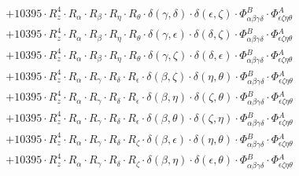 \documentclass{article}
\begin{document}
\begin{equation}
\begin{array}{c}
 \\[0.2em] 		 + 10395 \cdot R_{z}^{4} \cdot R_{\alpha{}} \cdot R_{\beta{}} \cdot R_{\eta{}} \cdot R_{\theta{}} \cdot \delta{}\left(\gamma{}, \delta{}\right) \cdot \delta{}\left(\epsilon{}, \zeta{}\right) \cdot \Phi{}^{B}_{\alpha{}\beta{}\gamma{}\delta{}} \cdot \Phi{}^{A}_{\epsilon{}\zeta{}\eta{}\theta{}} 
 \\[0.2em] 		 + 10395 \cdot R_{z}^{4} \cdot R_{\alpha{}} \cdot R_{\beta{}} \cdot R_{\eta{}} \cdot R_{\theta{}} \cdot \delta{}\left(\gamma{}, \epsilon{}\right) \cdot \delta{}\left(\delta{}, \zeta{}\right) \cdot \Phi{}^{B}_{\alpha{}\beta{}\gamma{}\delta{}} \cdot \Phi{}^{A}_{\epsilon{}\zeta{}\eta{}\theta{}} 
 \\[0.2em] 		 + 10395 \cdot R_{z}^{4} \cdot R_{\alpha{}} \cdot R_{\beta{}} \cdot R_{\eta{}} \cdot R_{\theta{}} \cdot \delta{}\left(\gamma{}, \zeta{}\right) \cdot \delta{}\left(\delta{}, \epsilon{}\right) \cdot \Phi{}^{B}_{\alpha{}\beta{}\gamma{}\delta{}} \cdot \Phi{}^{A}_{\epsilon{}\zeta{}\eta{}\theta{}} 
 \\[0.2em] 		 + 10395 \cdot R_{z}^{4} \cdot R_{\alpha{}} \cdot R_{\gamma{}} \cdot R_{\delta{}} \cdot R_{\epsilon{}} \cdot \delta{}\left(\beta{}, \zeta{}\right) \cdot \delta{}\left(\eta{}, \theta{}\right) \cdot \Phi{}^{B}_{\alpha{}\beta{}\gamma{}\delta{}} \cdot \Phi{}^{A}_{\epsilon{}\zeta{}\eta{}\theta{}} 
 \\[0.2em] 		 + 10395 \cdot R_{z}^{4} \cdot R_{\alpha{}} \cdot R_{\gamma{}} \cdot R_{\delta{}} \cdot R_{\epsilon{}} \cdot \delta{}\left(\beta{}, \eta{}\right) \cdot \delta{}\left(\zeta{}, \theta{}\right) \cdot \Phi{}^{B}_{\alpha{}\beta{}\gamma{}\delta{}} \cdot \Phi{}^{A}_{\epsilon{}\zeta{}\eta{}\theta{}} 
 \\[0.2em] 		 + 10395 \cdot R_{z}^{4} \cdot R_{\alpha{}} \cdot R_{\gamma{}} \cdot R_{\delta{}} \cdot R_{\epsilon{}} \cdot \delta{}\left(\beta{}, \theta{}\right) \cdot \delta{}\left(\zeta{}, \eta{}\right) \cdot \Phi{}^{B}_{\alpha{}\beta{}\gamma{}\delta{}} \cdot \Phi{}^{A}_{\epsilon{}\zeta{}\eta{}\theta{}} 
 \\[0.2em] 		 + 10395 \cdot R_{z}^{4} \cdot R_{\alpha{}} \cdot R_{\gamma{}} \cdot R_{\delta{}} \cdot R_{\zeta{}} \cdot \delta{}\left(\beta{}, \epsilon{}\right) \cdot \delta{}\left(\eta{}, \theta{}\right) \cdot \Phi{}^{B}_{\alpha{}\beta{}\gamma{}\delta{}} \cdot \Phi{}^{A}_{\epsilon{}\zeta{}\eta{}\theta{}} 
 \\[0.2em] 		 + 10395 \cdot R_{z}^{4} \cdot R_{\alpha{}} \cdot R_{\gamma{}} \cdot R_{\delta{}} \cdot R_{\zeta{}} \cdot \delta{}\left(\beta{}, \eta{}\right) \cdot \delta{}\left(\epsilon{}, \theta{}\right) \cdot \Phi{}^{B}_{\alpha{}\beta{}\gamma{}\delta{}} \cdot \Phi{}^{A}_{\epsilon{}\zeta{}\eta{}\theta{}} 

\end{array}
\end{equation}
\end{document}
